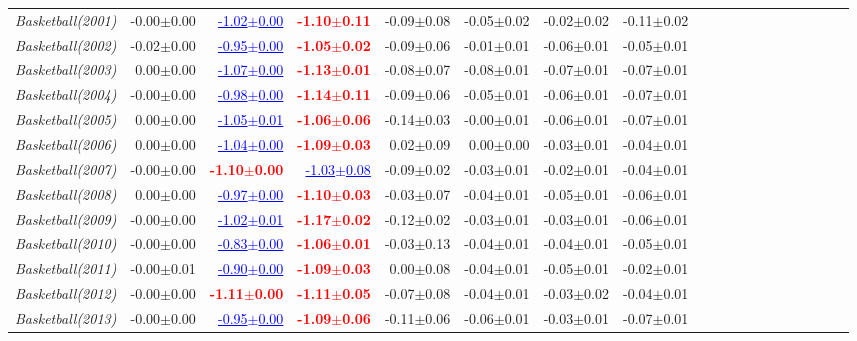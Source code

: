 \documentclass[nohyperref]{article}
\theoremstyle{plain}
\theoremstyle{definition}
\theoremstyle{remark}
\newcommand{\red}[1]{\textcolor{red}{\textbf{#1}}}
\newcommand{\blue}[1]{\textcolor{blue}{\underline{#1}}}
\begin{document}
\begin{table*}[!ht]
{\begin{tabular}{lrrrrrrrrrrrrrrrrrr}
			{\it Basketball(2001)} & -0.00$\pm$0.00 & \blue{-1.02$\pm$0.00} & \red{-1.10$\pm$0.11} & -0.09$\pm$0.08 & -0.05$\pm$0.02 & -0.02$\pm$0.02 & -0.11$\pm$0.02 \\
			{\it Basketball(2002)} & -0.02$\pm$0.00 & \blue{-0.95$\pm$0.00} & \red{-1.05$\pm$0.02} & -0.09$\pm$0.06 & -0.01$\pm$0.01 & -0.06$\pm$0.01 & -0.05$\pm$0.01 \\
			{\it Basketball(2003)} & 0.00$\pm$0.00 & \blue{-1.07$\pm$0.00} & \red{-1.13$\pm$0.01} & -0.08$\pm$0.07 & -0.08$\pm$0.01 & -0.07$\pm$0.01 & -0.07$\pm$0.01 \\
			{\it Basketball(2004)} & -0.00$\pm$0.00 & \blue{-0.98$\pm$0.00} & \red{-1.14$\pm$0.11} & -0.09$\pm$0.06 & -0.05$\pm$0.01 & -0.06$\pm$0.01 & -0.07$\pm$0.01 \\
			{\it Basketball(2005)} & 0.00$\pm$0.00 & \blue{-1.05$\pm$0.01} & \red{-1.06$\pm$0.06} & -0.14$\pm$0.03 & -0.00$\pm$0.01 & -0.06$\pm$0.01 & -0.07$\pm$0.01 \\
			{\it Basketball(2006)} & 0.00$\pm$0.00 & \blue{-1.04$\pm$0.00} & \red{-1.09$\pm$0.03} & 0.02$\pm$0.09 & 0.00$\pm$0.00 & -0.03$\pm$0.01 & -0.04$\pm$0.01 \\
			{\it Basketball(2007)} & -0.00$\pm$0.00 & \red{-1.10$\pm$0.00} & \blue{-1.03$\pm$0.08} & -0.09$\pm$0.02 & -0.03$\pm$0.01 & -0.02$\pm$0.01 & -0.04$\pm$0.01 \\
			{\it Basketball(2008)} & 0.00$\pm$0.00 & \blue{-0.97$\pm$0.00} & \red{-1.10$\pm$0.03} & -0.03$\pm$0.07 & -0.04$\pm$0.01 & -0.05$\pm$0.01 & -0.06$\pm$0.01 \\
			{\it Basketball(2009)} & -0.00$\pm$0.00 & \blue{-1.02$\pm$0.01} & \red{-1.17$\pm$0.02} & -0.12$\pm$0.02 & -0.03$\pm$0.01 & -0.03$\pm$0.01 & -0.06$\pm$0.01 \\
			{\it Basketball(2010)} & -0.00$\pm$0.00 & \blue{-0.83$\pm$0.00} & \red{-1.06$\pm$0.01} & -0.03$\pm$0.13 & -0.04$\pm$0.01 & -0.04$\pm$0.01 & -0.05$\pm$0.01 \\
			{\it Basketball(2011)} & -0.00$\pm$0.01 & \blue{-0.90$\pm$0.00} & \red{-1.09$\pm$0.03} & 0.00$\pm$0.08 & -0.04$\pm$0.01 & -0.05$\pm$0.01 & -0.02$\pm$0.01 \\
			{\it Basketball(2012)} & -0.00$\pm$0.00 & \red{-1.11$\pm$0.00} & \red{-1.11$\pm$0.05} & -0.07$\pm$0.08 & -0.04$\pm$0.01 & -0.03$\pm$0.02 & -0.04$\pm$0.01 \\
			{\it Basketball(2013)} & -0.00$\pm$0.00 & \blue{-0.95$\pm$0.00} & \red{-1.09$\pm$0.06} & -0.11$\pm$0.06 & -0.06$\pm$0.01 & -0.03$\pm$0.01 & -0.07$\pm$0.01 \\

\end{tabular}}
\end{table*}
\end{document}
